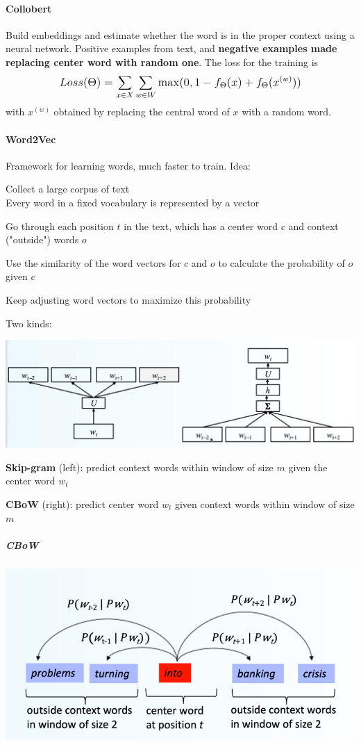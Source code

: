\documentclass[10pt]{report}
\begin{document}
\paragraph{Collobert} Build embeddings and estimate whether the word is in the proper context using a neural network. Positive examples from text, and \textbf{negative examples made replacing center word with random one}. The loss for the training is $$\mathlarger{Loss(\Theta) = \sum_{x\in X}\sum_{w\in W} \max(0, 1-f_\Theta(x) + f_\Theta(x^{(w)}))}$$
with $x^{(w)}$ obtained by replacing the central word of $x$ with a random word.
\paragraph{Word2Vec} Framework for learning words, much faster to train. Idea:\begin{list}{}{}
	\item Collect a large corpus of text\\
	Every word in a fixed vocabulary is represented by a vector
	\item Go through each position $t$ in the text, which has a center word $c$ and context ("outside") words $o$
	\item Use the similarity of the word vectors for $c$ and $o$ to calculate the probability of $o$ given $c$
	\item Keep adjusting word vectors to maximize this probability
\end{list}
Two kinds:
\begin{center}
	\includegraphics[scale=0.45]{3.png}
\end{center}
\begin{list}{}{}
	\item \textbf{Skip-gram} (left): predict context words within window of size $m$ given the center word $w_t$
	\item \textbf{CBoW} (right): predict center word $w_t$ given context words within window of size $m$
\end{list}
\subparagraph{CBoW}
\begin{center}
	\includegraphics[scale=0.4]{4.png}
\end{center}
\end{document}
